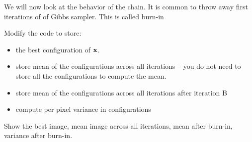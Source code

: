 \documentclass{article}
\begin{document}
\newproblem{2pt}
We will now look at the behavior of the chain.
It is common to throw away first iterations of of Gibbs sampler. This is called burn-in

Modify the code to store:
\begin{itemize}
\item the best configuration of $\mathbf{x}$.
\item store mean of the configurations across all iterations -- you do not need to store all the
configurations to compute the mean.
\item store mean of the configurations across all iterations after iteration B
\item compute per pixel variance in configurations
\end{itemize}

Show the best image, mean image across all iterations, mean after burn-in, variance
after burn-in.
\end{document}
